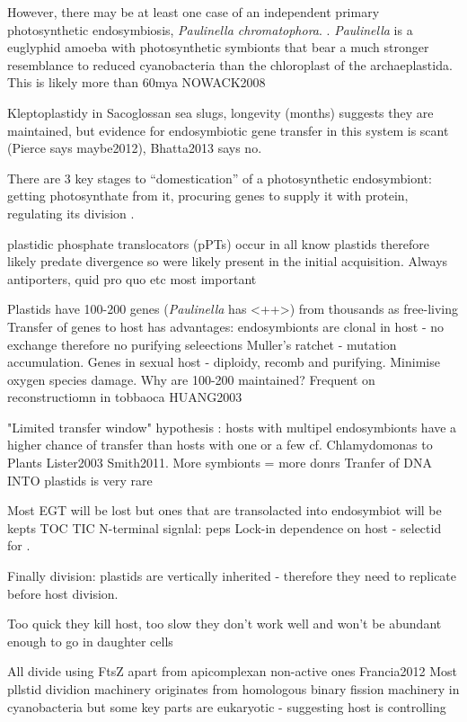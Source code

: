However, there may be at least one case of an independent primary photosynthetic endosymbiosis, \textit{Paulinella chromatophora}.
\citep{McFadden2014}. \textit{Paulinella} is a euglyphid amoeba with photosynthetic symbionts that bear a much stronger
resemblance to reduced cyanobacteria than the chloroplast of the archaeplastida.  
This is likely more than 60mya  NOWACK2008


Kleptoplastidy in Sacoglossan sea slugs, longevity (months) suggests they are maintained, 
but evidence for endosymbiotic gene transfer in this system is scant (Pierce says maybe2012), Bhatta2013 says no.


There are 3 key stages to ``domestication'' of a photosynthetic endosymbiont: getting photosynthate from it,
procuring genes to supply it with protein, regulating its division \citep{McFadden2014}.

plastidic phosphate translocators (pPTs) occur in all know plastids therefore likely predate divergence so were
likely present in the initial acquisition.  Always antiporters, quid pro quo etc  most important


Plastids have 100-200 genes (\textit{Paulinella} has <++>) from thousands as free-living
Transfer of genes to host has advantages: endosymbionts are clonal in host - no exchange therefore no purifying seleections
Muller's ratchet - mutation accumulation.
Genes in sexual host - diploidy, recomb and purifying.
Minimise oxygen species damage.
Why are 100-200 maintained?
Frequent on reconstructiomn in tobbaoca HUANG2003

"Limited transfer window" hypothesis : hosts with multipel endosymbionts have a higher chance of transfer than hosts 
with one or a few cf. Chlamydomonas to Plants Lister2003 Smith2011. More symbionts = more donrs 
Tranfer of DNA INTO plastids is very rare  

Most EGT will be lost but ones that are transolacted into endosymbiot will be kepts TOC TIC N-terminal signlal: peps
Lock-in dependence on host - selectid for .


Finally division: plastids are vertically inherited - therefore they need to replicate before host division.

Too quick they kill host, too slow they don't work well and won't be abundant enough to go in daughter cells


All divide using FtsZ apart from apicomplexan non-active ones Francia2012
Most pllstid dividion machinery originates from homologous binary fission machinery in cyanobacteria
but some key parts are eukaryotic - suggesting host is controlling 

